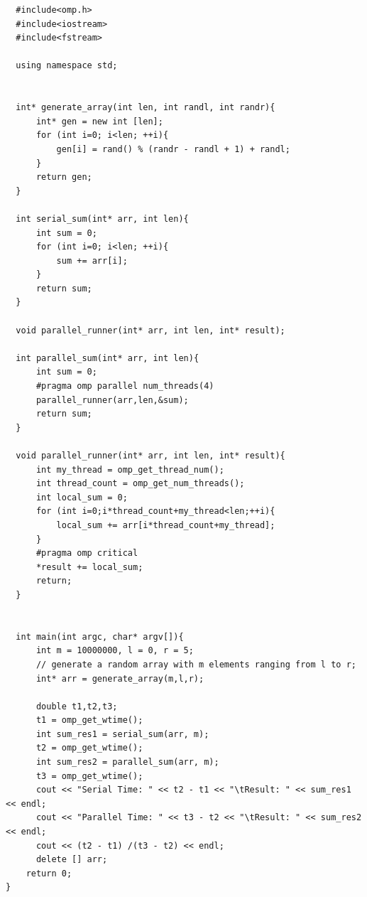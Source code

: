 \begin{verbatim}
  #include<omp.h>
  #include<iostream>
  #include<fstream>

  using namespace std; 


  int* generate_array(int len, int randl, int randr){
      int* gen = new int [len];
      for (int i=0; i<len; ++i){
          gen[i] = rand() % (randr - randl + 1) + randl;
      }
      return gen;
  }

  int serial_sum(int* arr, int len){
      int sum = 0;
      for (int i=0; i<len; ++i){
          sum += arr[i];
      }
      return sum;
  }

  void parallel_runner(int* arr, int len, int* result);

  int parallel_sum(int* arr, int len){
      int sum = 0;
      #pragma omp parallel num_threads(4)
      parallel_runner(arr,len,&sum);
      return sum;
  }

  void parallel_runner(int* arr, int len, int* result){
      int my_thread = omp_get_thread_num();
      int thread_count = omp_get_num_threads();
      int local_sum = 0;
      for (int i=0;i*thread_count+my_thread<len;++i){
          local_sum += arr[i*thread_count+my_thread];
      }
      #pragma omp critical
      *result += local_sum;
      return;
  }


  int main(int argc, char* argv[]){
      int m = 10000000, l = 0, r = 5;
      // generate a random array with m elements ranging from l to r;
      int* arr = generate_array(m,l,r);

      double t1,t2,t3;
      t1 = omp_get_wtime();
      int sum_res1 = serial_sum(arr, m);
      t2 = omp_get_wtime();
      int sum_res2 = parallel_sum(arr, m);
      t3 = omp_get_wtime();
      cout << "Serial Time: " << t2 - t1 << "\tResult: " << sum_res1 << endl;
      cout << "Parallel Time: " << t3 - t2 << "\tResult: " << sum_res2 << endl;
      cout << (t2 - t1) /(t3 - t2) << endl;
      delete [] arr;
    return 0;
}
\end{verbatim}